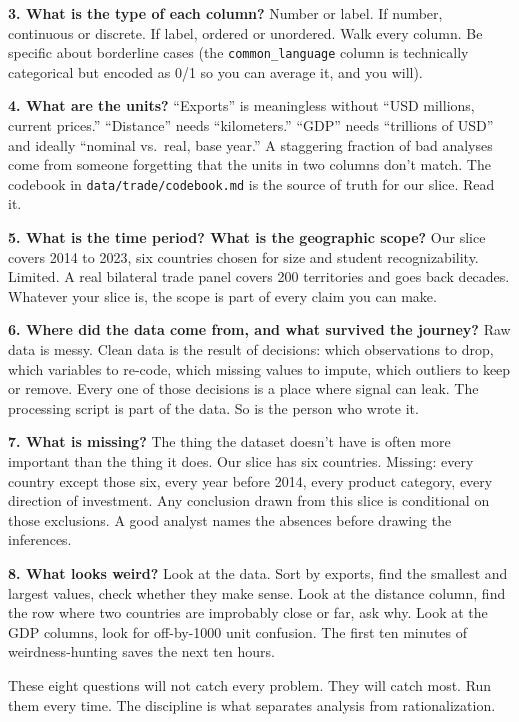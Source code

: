 \documentclass[
  letterpaper,
  11pt,
  twoside,
  openany]{scrbook}
\begin{document}
\textbf{3. What is the type of each column?} Number or label. If number,
continuous or discrete. If label, ordered or unordered. Walk every
column. Be specific about borderline cases (the
\texttt{common\_language} column is technically categorical but encoded
as 0/1 so you can average it, and you will).

\textbf{4. What are the units?} ``Exports'' is meaningless without ``USD
millions, current prices.'' ``Distance'' needs ``kilometers.'' ``GDP''
needs ``trillions of USD'' and ideally ``nominal vs.~real, base year.''
A staggering fraction of bad analyses come from someone forgetting that
the units in two columns don't match. The codebook in
\texttt{data/trade/codebook.md} is the source of truth for our slice.
Read it.

\textbf{5. What is the time period? What is the geographic scope?} Our
slice covers 2014 to 2023, six countries chosen for size and student
recognizability. Limited. A real bilateral trade panel covers 200
territories and goes back decades. Whatever your slice is, the scope is
part of every claim you can make.

\textbf{6. Where did the data come from, and what survived the journey?}
Raw data is messy. Clean data is the result of decisions: which
observations to drop, which variables to re-code, which missing values
to impute, which outliers to keep or remove. Every one of those
decisions is a place where signal can leak. The processing script is
part of the data. So is the person who wrote it.

\textbf{7. What is missing?} The thing the dataset doesn't have is often
more important than the thing it does. Our slice has six countries.
Missing: every country except those six, every year before 2014, every
product category, every direction of investment. Any conclusion drawn
from this slice is conditional on those exclusions. A good analyst names
the absences before drawing the inferences.

\textbf{8. What looks weird?} Look at the data. Sort by exports, find
the smallest and largest values, check whether they make sense. Look at
the distance column, find the row where two countries are improbably
close or far, ask why. Look at the GDP columns, look for off-by-1000
unit confusion. The first ten minutes of weirdness-hunting saves the
next ten hours.

These eight questions will not catch every problem. They will catch
most. Run them every time. The discipline is what separates analysis
from rationalization.
\end{document}
